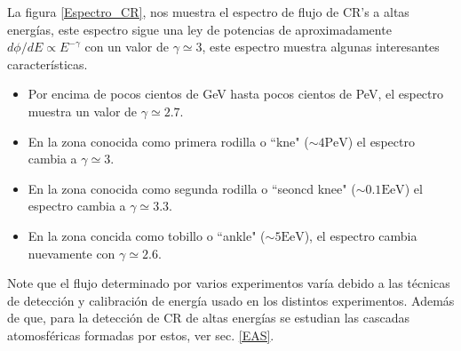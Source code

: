 La figura \ref{Espectro_CR}, nos muestra el espectro de flujo de CR's a altas energías, este espectro sigue una ley de potencias de aproximadamente $d\phi /dE \propto E^{-\gamma}$ con un valor de $\gamma \simeq 3$, este espectro muestra algunas interesantes características.
\begin{itemize}
	\item Por encima de pocos cientos de GeV hasta pocos cientos de PeV, el espectro muestra un valor de $\gamma \simeq 2.7$.
	\item En la zona conocida como primera rodilla o ``kne" ($\sim 4 \mbox{PeV}$) el espectro cambia a $\gamma \simeq 3$.
	\item En la zona conocida como segunda rodilla o ``seoncd knee" ($\sim 0.1 \mbox{EeV}$) el espectro cambia a $\gamma \simeq 3.3$.
	\item En la zona concida como tobillo o ``ankle" ($\sim 5 \mbox{EeV}$), el espectro cambia nuevamente con $\gamma \simeq 2.6$.
\end{itemize}

Note que el flujo determinado por varios experimentos varía debido a las técnicas de detección y calibración de energía usado en los distintos experimentos. Además de que, para la detección de CR de altas energías se estudian las cascadas atomosféricas formadas por estos, ver sec. \ref{EAS}.